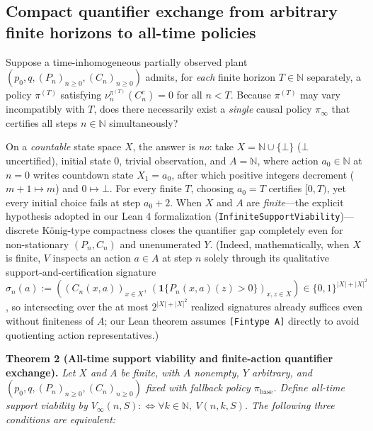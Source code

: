 \documentclass[11pt,a4paper]{article}
\newcounter{none}
\begin{document}
\subsection{Compact quantifier exchange from arbitrary finite horizons
to all-time
policies}\label{compact-quantifier-exchange-from-arbitrary-finite-horizons-to-all-time-policies}

Suppose a time-inhomogeneous partially observed plant
\((p_0, q, (P_n)_{n\ge 0}, (C_n)_{n\ge 0})\) admits, for \emph{each}
finite horizon \(T \in \mathbb{N}\) separately, a policy \(\pi^{(T)}\)
satisfying \(\nu_n^{\pi^{(T)}}(C_n^c) = 0\) for all \(n < T\). Because
\(\pi^{(T)}\) may vary incompatibly with \(T\), does there necessarily
exist a \emph{single} causal policy \(\pi_\infty\) that certifies all
steps \(n \in \mathbb{N}\) simultaneously?

On a \emph{countable} state space \(X\), the answer is \emph{no}: take
\(X = \mathbb{N} \cup \{\bot\}\) (\(\bot\) uncertified), initial state
\(0\), trivial observation, and \(A = \mathbb{N}\), where action
\(a_0 \in \mathbb{N}\) at \(n = 0\) writes countdown state
\(X_1 = a_0\), after which positive integers decrement
(\(m+1 \mapsto m\)) and \(0 \mapsto \bot\). For every finite \(T\),
choosing \(a_0 = T\) certifies \([0, T)\), yet every initial choice
fails at step \(a_0 + 2\). When \(X\) and \(A\) are \emph{finite}---the
explicit hypothesis adopted in our Lean 4 formalization
(\texttt{InfiniteSupportViability})---discrete König-type compactness
\citep{konig1927} closes the quantifier gap completely even for
non-stationary \((P_n, C_n)\) and unenumerated \(Y\). (Indeed,
mathematically, when \(X\) is finite, \(V\) inspects an action
\(a \in A\) at step \(n\) solely through its qualitative
support-and-certification signature
\(\sigma_n(a) := ((C_n(x,a))_{x\in X},\, (\mathbf{1}\{P_n(x,a)(z) > 0\})_{x,z\in X}) \in \{0,1\}^{|X|+|X|^2}\),
so intersecting over the at most \(2^{|X|+|X|^2}\) realized signatures
already suffices even without finiteness of \(A\); our Lean theorem
assumes \texttt{{[}Fintype\ A{]}} directly to avoid quotienting action
representatives.)

\textbf{Theorem 2 (All-time support viability and finite-action
quantifier exchange).} \emph{Let \(X\) and \(A\) be finite, with \(A\)
nonempty, \(Y\) arbitrary, and
\((p_0, q, (P_n)_{n\ge 0}, (C_n)_{n\ge 0})\) fixed with fallback policy
\(\pi_{\mathrm{base}}\). Define all-time support viability by
\(V_\infty(n, S) :\iff \forall k \in \mathbb{N},\ V(n, k, S)\). The
following three conditions are equivalent:}
\end{document}
